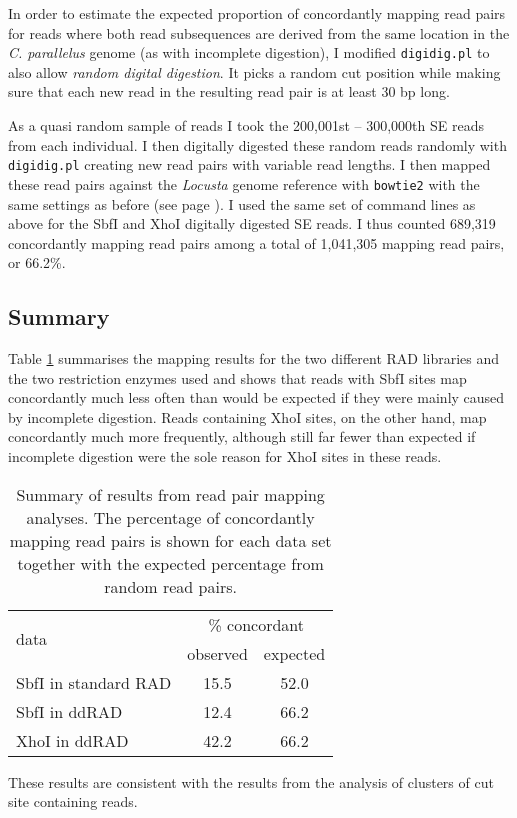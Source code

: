 \documentclass[a4paper,12pt,times,authoryear,twoside,print,index]{Classes/PhDThesisPSnPDF}\usepackage[]{graphicx}\usepackage[]{color}
\begin{document}
In order to estimate the expected proportion of \gls{concordant}ly mapping read pairs for reads where both read subsequences are derived from the same location in the \textit{C. parallelus} genome (as with incomplete digestion), I modified \texttt{digidig.pl} to also allow \emph{random digital digestion}. It picks a random cut position while making sure that each new read in the resulting read pair is at least 30 bp long. 

As a quasi random sample of reads I took the 200,001st -- 300,000th SE reads  from each individual. I then digitally digested these random reads randomly with \texttt{digidig.pl} creating new read pairs with variable read lengths. I then mapped these read pairs against the \textit{Locusta} genome reference with \texttt{bowtie2} with the same settings as before (see page \pageref{read_pair_mapping_analysis}). I used the same set of command lines as above for the SbfI and XhoI digitally digested SE reads. I thus counted 689,319 \gls{concordant}ly mapping read pairs among a total of 1,041,305 mapping read pairs, or 66.2\%.

\subsection{Summary}

Table \ref{tab:mapping_summary} summarises the mapping results for the two different RAD libraries and the two restriction enzymes used and shows that reads with SbfI sites map concordantly much less often than would be expected if they were mainly caused by incomplete digestion. Reads containing XhoI sites, on the other hand, map concordantly much more frequently, although still far fewer than expected if incomplete digestion were the sole reason for XhoI sites in these reads.
%
\begin{table}
\centering
\caption{\small Summary of results from read pair mapping analyses. The percentage of concordantly mapping read pairs is shown for each data set together with the expected percentage from random read pairs.}
\label{tab:mapping_summary}
\vspace{5pt}
\begin{tabular}{lcc}
\toprule
\multirow{2}{*}{data} & \multicolumn{2}{c}{\% concordant} \\
                                    & observed & expected \\
\midrule
SbfI in standard RAD & 15.5 & 52.0  \\
SbfI in ddRAD & 12.4 & 66.2 \\
XhoI in ddRAD & 42.2 & 66.2 \\
\bottomrule
\end{tabular}
\end{table}
%
These results are consistent with the results from the analysis of clusters of cut site containing reads. 
\end{document}
